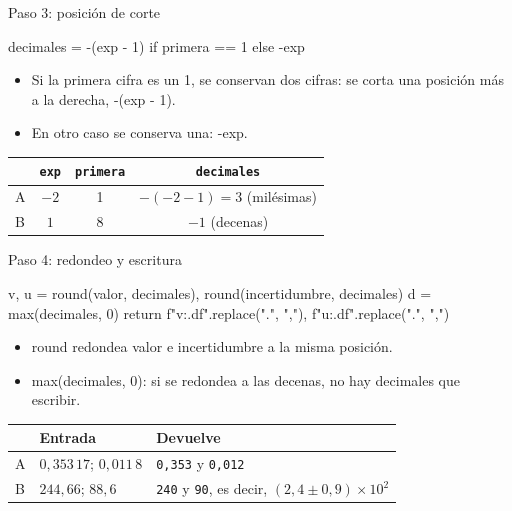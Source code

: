 \documentclass[10pt]{beamer}
\newcommand{\cod}[1]{{\setlength{\fboxsep}{1.4pt}\colorbox{codinline}{\textcolor{codrojo}{\ttfamily\small #1}}}}
\newcommand{\resalta}[1]{\textcolor{structure.fg!75!white}{#1}}
\begin{document}
\begin{frame}[fragile]{Paso 3: posición de corte}
  \begin{codigo}
decimales = -(exp - 1) if primera == 1 else -exp
  \end{codigo}
  \begin{itemize}
    \item Si la primera cifra es un 1, se conservan \resalta{dos} cifras:
      se corta una posición más a la derecha, \cod{-(exp - 1)}.
    \item En otro caso se conserva \resalta{una}: \cod{-exp}.
  \end{itemize}
  \begin{block}{}
    \centering
    \begin{tabular}{@{}lccc@{}}
      & \texttt{exp} & \texttt{primera} & \texttt{decimales}\\
      \midrule
      A & $-2$ & 1 & $-(-2-1)=3$ \quad (milésimas)\\
      B & $1$ & 8 & $-1$ \quad (decenas)\\
    \end{tabular}
  \end{block}
\end{frame}

\begin{frame}[fragile]{Paso 4: redondeo y escritura}
  \begin{codigo}[listing options={style=python, basicstyle=\ttfamily\scriptsize\color{codtexto}}]
v, u = round(valor, decimales), round(incertidumbre, decimales)
d = max(decimales, 0)
return f"{v:.{d}f}".replace(".", ","), f"{u:.{d}f}".replace(".", ",")
  \end{codigo}
  \begin{itemize}
    \item \cod{round} redondea valor e incertidumbre a la \resalta{misma
      posición}.
    \item \cod{max(decimales, 0)}: si se redondea a las decenas, no hay
      decimales que escribir.
  \end{itemize}
  \begin{block}{}
    \centering
    \begin{tabular}{@{}lll@{}}
      & Entrada & Devuelve\\
      \midrule
      A & $0{,}353\,17$; $0{,}011\,8$ & \texttt{0,353} y \texttt{0,012}\\
      B & $244{,}66$; $88{,}6$ & \texttt{240} y \texttt{90}, es decir,
      $(2{,}4\pm0{,}9)\times10^{2}$\\
    \end{tabular}
  \end{block}
\end{frame}
\end{document}
